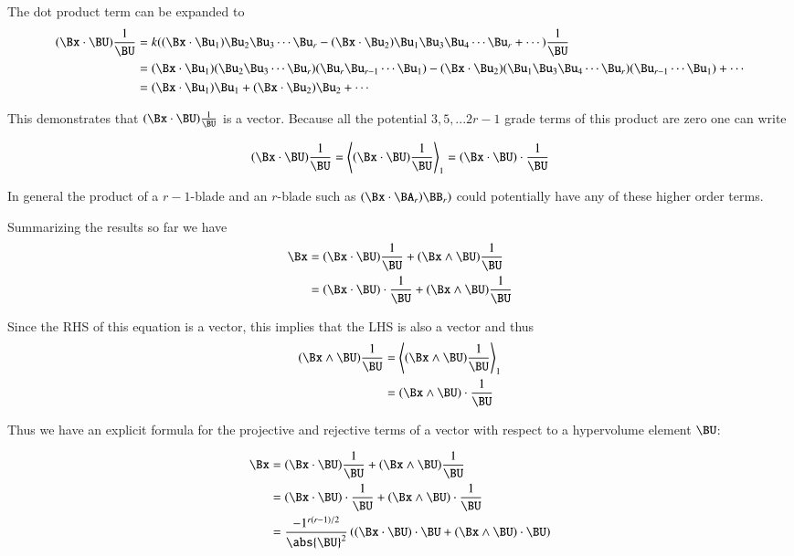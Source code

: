 The dot product term can be expanded to
\begin{align*}
(\Bx \cdot \BU) \frac{1}{\BU} 
&= k(
      (\Bx \cdot \Bu_1)\Bu_2\Bu_3\cdots\Bu_r
    - (\Bx \cdot \Bu_2)\Bu_1\Bu_3\Bu_4\cdots\Bu_r
    + \cdots
    ) \frac{1}{\BU} \\
&= 
  (\Bx \cdot \Bu_1)(\Bu_2\Bu_3\cdots\Bu_r)(\Bu_r\Bu_{r-1}\cdots\Bu_1)
- (\Bx \cdot \Bu_2)(\Bu_1\Bu_3\Bu_4\cdots\Bu_r)(\Bu_{r-1}\cdots\Bu_1)
+ \cdots \\
&= 
  (\Bx \cdot \Bu_1)\Bu_1
+ (\Bx \cdot \Bu_2)\Bu_2
+ \cdots \\
\end{align*}

This demonstrates that $(\Bx \cdot \BU) \frac{1}{\BU}$ is a vector.  Because all the potential $3, 5, ... 2r-1$ grade terms of this product are zero one can write

\[
(\Bx \cdot \BU) \frac{1}{\BU} = \left<(\Bx \cdot \BU) \frac{1}{\BU}\right>_1 = (\Bx \cdot \BU) \cdot \frac{1}{\BU}
\]

In general the product of a $r-1$-blade and an $r$-blade such as $(\Bx \cdot \BA_r)\BB_r)$ could potentially have any of these higher order terms.

Summarizing the results so far we have
\begin{align*}
\Bx
&= (\Bx \cdot \BU)\frac{1}{\BU} + (\Bx \wedge \BU)\frac{1}{\BU} \\
&= (\Bx \cdot \BU) \cdot \frac{1}{\BU} + (\Bx \wedge \BU)\frac{1}{\BU} \\
\end{align*}

Since the RHS of this equation is a vector, this implies that the LHS is also a vector and thus
\begin{align*}
(\Bx \wedge \BU)\frac{1}{\BU} 
&= \left<(\Bx \wedge \BU)\frac{1}{\BU}\right>_1 \\
&= (\Bx \wedge \BU) \cdot \frac{1}{\BU} \\
\end{align*}

Thus we have an explicit formula for the projective and rejective terms of a vector with respect to a hypervolume element $\BU$:

\begin{align*}
\Bx
&= (\Bx \cdot \BU)\frac{1}{\BU} + (\Bx \wedge \BU)\frac{1}{\BU} \\
&= (\Bx \cdot \BU) \cdot \frac{1}{\BU} + (\Bx \wedge \BU) \cdot \frac{1}{\BU} \\
&= \frac{-1^{r(r-1)/2}}{\abs{\BU}^2}
\left( (\Bx \cdot \BU) \cdot {\BU} + (\Bx \wedge \BU) \cdot {\BU} \right) \\
\end{align*}

